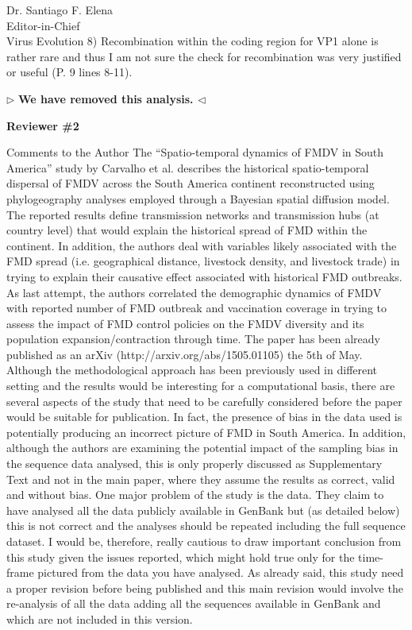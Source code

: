 \documentclass[12pt, a4paper]{letter} %
\newenvironment{reply}{$\triangleright$\bf}{$\triangleleft$}
\begin{document}
\begin{letter}{
	Dr. Santiago F. Elena\\
    Editor-in-Chief \\
    Virus Evolution
}
8)      Recombination within the coding region for VP1 alone is rather rare and thus I am not sure the check for recombination was very justified or useful (P. 9 lines 8-11).

\begin{reply}
We have removed this analysis.
\end{reply}


\textbf{Reviewer \#2}

Comments to the Author
The ``Spatio-temporal dynamics of FMDV in South America'' study by Carvalho et al. describes the historical spatio-temporal dispersal of FMDV across the South America continent reconstructed using phylogeography analyses employed through a Bayesian spatial diffusion model. 
The reported results define transmission networks and transmission hubs (at country level) that would explain the historical spread of FMD within the continent. 
In addition, the authors deal with variables likely associated with the FMD spread (i.e. geographical distance, livestock density, and livestock trade) in trying to explain their causative effect associated with historical FMD outbreaks. 
As last attempt, the authors correlated the demographic dynamics of FMDV with reported number of FMD outbreak and vaccination coverage in trying to assess the impact of FMD control policies on the FMDV diversity and its population expansion/contraction through time. 
The paper has been already published as an arXiv (http://arxiv.org/abs/1505.01105) the 5th of May. 
Although the methodological approach has been previously used in different setting and the results would be interesting for a computational basis, there are several aspects of the study that need to be carefully considered before the paper would be suitable for publication. 
In fact, the presence of bias in the data used is potentially producing an incorrect picture of FMD in South America. 
In addition, although the authors are examining the potential impact of the sampling bias in the sequence data analysed, this is only properly discussed as Supplementary Text and not in the main paper, where they assume the results as correct, valid and without bias. 
One major problem of the study is the data. 
They claim to have analysed all the data publicly available in GenBank but (as detailed below) this is not correct and the analyses should be repeated including the full sequence dataset. 
I would be, therefore, really cautious to draw important conclusion from this study given the issues reported, which might hold true only for the time-frame pictured from the data you have analysed. 
As already said, this study need a proper revision before being published and this main revision would involve the re-analysis of all the data adding all the sequences available in GenBank and which are not included in this version.


\end{letter}
\end{document}
